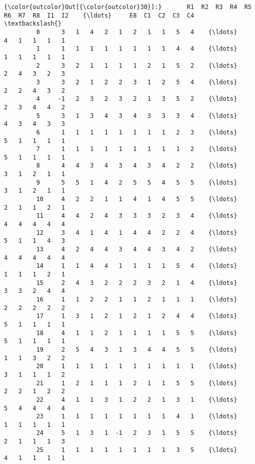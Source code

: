 \documentclass[11pt]{article}
\begin{document}
            \begin{Verbatim}[commandchars=\\\{\}]
{\color{outcolor}Out[{\color{outcolor}30}]:}       R1  R2  R3  R4  R5  R6  R7  R8  I1  I2    {\ldots}     E8  C1  C2  C3  C4  \textbackslash{}
         0      3   1   4   2   1   2   1   1   5   4    {\ldots}      4   1   1   1   1   
         1      1   1   1   1   1   1   1   1   4   4    {\ldots}      1   1   1   1   1   
         2      3   2   1   1   1   1   2   1   5   2    {\ldots}      2   4   3   2   3   
         3      3   2   1   2   2   3   1   2   5   4    {\ldots}      2   2   4   3   2   
         4     -1   2   3   2   3   2   1   3   5   2    {\ldots}      2   3   4   4   2   
         5      3   1   3   4   3   4   3   3   3   4    {\ldots}      4   3   4   3   3   
         6      1   1   1   1   1   1   1   1   2   3    {\ldots}      5   1   1   1   1   
         7      1   1   1   1   1   1   1   1   1   2    {\ldots}      5   1   1   1   1   
         8      4   4   3   4   3   4   3   4   2   2    {\ldots}      3   1   2   1   1   
         9      5   5   1   4   2   5   5   4   5   5    {\ldots}      3   1   2   1   1   
         10     4   2   2   1   1   4   1   4   5   5    {\ldots}      2   1   1   2   1   
         11     4   4   2   4   3   3   3   2   3   4    {\ldots}      4   4   4   4   4   
         12     3   4   1   4   1   4   4   2   2   4    {\ldots}      5   1   1   4   3   
         13     4   2   4   4   3   4   4   3   4   2    {\ldots}      4   4   4   4   4   
         14     1   1   4   4   1   1   1   1   5   4    {\ldots}      1   1   1   2   1   
         15     2   4   3   2   2   2   3   2   1   4    {\ldots}      3   3   2   4   4   
         16     1   1   2   2   1   1   2   1   1   1    {\ldots}      2   2   2   2   2   
         17     1   3   1   2   1   2   1   2   4   4    {\ldots}      5   1   1   1   1   
         18     4   1   1   2   1   1   1   1   5   5    {\ldots}      5   1   1   1   1   
         19     2   5   4   3   1   3   4   4   5   5    {\ldots}      1   1   3   2   2   
         20     1   1   1   1   1   1   1   1   1   1    {\ldots}      3   1   1   1   2   
         21     1   2   1   1   1   2   1   1   5   5    {\ldots}      2   2   1   2   2   
         22     4   1   1   3   1   2   2   1   3   1    {\ldots}      5   4   4   4   4   
         23     1   1   1   1   1   1   1   1   4   1    {\ldots}      1   1   1   1   1   
         24     5   1   3   1  -1   2   3   1   5   5    {\ldots}      2   1   1   1   3   
         25     1   1   1   1   1   1   1   1   3   5    {\ldots}      4   1   1   1   1   

\end{Verbatim}
\end{document}

